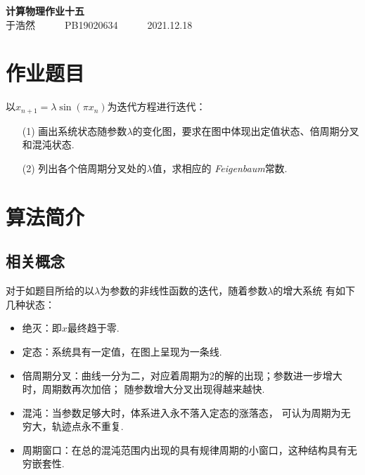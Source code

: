 \documentclass[12pt,a4paper,utf8]{ctexart}
\begin{document}
\begin{center}
    {\LARGE\textbf{计算物理作业十五}}\\
    \textrm{于浩然}~~~~~~\textrm{PB19020634}~~~~~~\textrm{2021.12.18}
\end{center}

\section{作业题目}

以$x_{n+1} = \lambda \sin(\pi x_n)$为迭代方程进行迭代：
\begin{enumerate}
    \item[(1)]
        画出系统状态随参数$\lambda$的变化图，要求在图中体现出定值状态、倍周期分叉
        和混沌状态.
    \item[(2)] 列出各个倍周期分叉处的$\lambda$值，求相应的
        \textsl{Feigenbaum}常数.
\end{enumerate}

\section{算法简介}
\subsection{相关概念}

对于如题目所给的以$\lambda$为参数的非线性函数的迭代，随着参数$\lambda$的增大系统
有如下几种状态： 
\begin{itemize}
    \item 绝灭：即$x$最终趋于零.
    \item 定态：系统具有一定值，在图上呈现为一条线.
    \item 倍周期分叉：曲线一分为二，对应着周期为2的解的出现；参数进一步增大时，周期数再次加倍；
        随参数增大分叉出现得越来越快.
    \item 混沌：当参数足够大时，体系进入永不落入定态的涨落态，
        可认为周期为无穷大，轨迹点永不重复.
    \item 周期窗口：在总的混沌范围内出现的具有规律周期的小窗口，这种结构具有无穷嵌套性.
\end{itemize}
\end{document}
